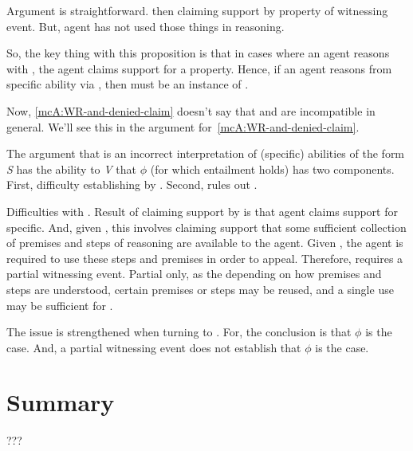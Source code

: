 \begin{note}
  Argument is straightforward.
  \adB{} then claiming support by property of witnessing event.
  But, agent has not used those things in reasoning.
\end{note}

\begin{note}
  So, the key thing with this proposition is that in cases where an agent reasons with \gsi{-}, the agent claims support for a property.
  Hence, if an agent reasons from specific ability via , then must be an instance of \AR{}.

  Now, \autoref{mcA:WR-and-denied-claim} doesn't say that \ESU{} and \WR{} are incompatible in general.
  We'll see this in the argument for~\autoref{mcA:WR-and-denied-claim}.

  The argument that \WR{} is an incorrect interpretation of (specific) abilities of the form \emph{S} has the ability to \emph{V} that \(\phi\) (for which  entailment holds) has two components.
  First, difficulty establishing by \gsi{}.
  Second, rules out .

  Difficulties with \gsi{}.
  Result of claiming support by \gsi{} is that agent claims support for specific.
  And, given \WR{}, this involves claiming support that some sufficient collection of premises and steps of reasoning are available to the agent.
  Given \ESU{}, the agent is required to use these steps and premises in order to appeal.
  Therefore, \ESU{} requires a partial witnessing event.
  Partial only, as the depending on how premises and steps are understood, certain premises or steps may be reused, and a single use may be sufficient for \ESU{}.

  The issue is strengthened when turning to .
  For, the conclusion is that \(\phi\) is the case.
  And, a partial witnessing event does not establish that \(\phi\) is the case.
\end{note}

\section{Summary}
\label{sec:uRa-and-wr-summary}

\begin{note}[Table]
  \begin{figure}[H]
    \centering
    \saMtxRuledOutESU{}
  \end{figure}
\end{note}

\begin{note}[Summarising]
  ???
\end{note}

